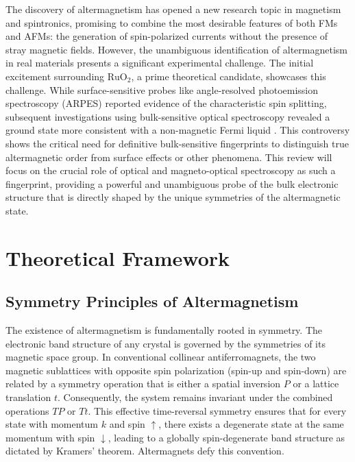 \documentclass{article}
\begin{document}
The discovery of altermagnetism has opened a new research topic in magnetism and spintronics, promising to combine the most desirable features of both FMs and AFMs: the generation of spin-polarized currents without the presence of stray magnetic fields. However, the unambiguous identification of altermagnetism in real materials presents a significant experimental challenge. The initial excitement surrounding \(\mathrm{RuO}_2\), a prime theoretical candidate, showcases this challenge. While surface-sensitive probes like angle-resolved photoemission spectroscopy (ARPES) reported evidence of the characteristic spin splitting, subsequent investigations using bulk-sensitive optical spectroscopy revealed a ground state more consistent with a non-magnetic Fermi liquid \cite{wenzel2025fermi}. This controversy shows the critical need for definitive bulk-sensitive fingerprints to distinguish true altermagnetic order from surface effects or other phenomena. This review will focus on the crucial role of optical and magneto-optical spectroscopy as such a fingerprint, providing a powerful and unambiguous probe of the bulk electronic structure that is directly shaped by the unique symmetries of the altermagnetic state.


\section{Theoretical Framework}
\subsection{Symmetry Principles of Altermagnetism}
The existence of altermagnetism is fundamentally rooted in symmetry. The electronic band structure of any crystal is governed by the symmetries of its magnetic space group. In conventional collinear antiferromagnets, the two magnetic sublattices with opposite spin polarization (spin-up and spin-down) are related by a symmetry operation that is either a spatial inversion $P$ or a lattice translation $t$. Consequently, the system remains invariant under the combined operations $TP$ or $Tt$. This effective time-reversal symmetry ensures that for every state with momentum $k$ and spin $\uparrow$, there exists a degenerate state at the same momentum with spin $\downarrow$, leading to a globally spin-degenerate band structure as dictated by Kramers' theorem.
Altermagnets defy this convention.
\end{document}
